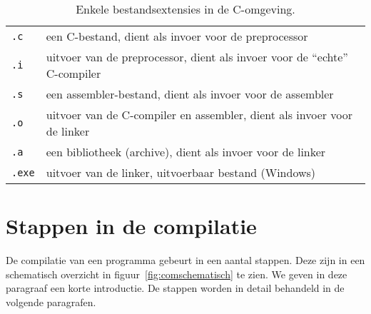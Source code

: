 \begin{table}[!ht]
\centering
\caption{Enkele bestandsextensies in de C-omgeving.}
\label{tab:comsuffix}
\begin{tabular}{ll}
\toprule
\texttt{.c}   & een C-bestand, dient als invoer voor de preprocessor \\
\texttt{.i}   & uitvoer van de preprocessor, dient als invoer voor de ``echte'' C-compiler \\
\texttt{.s}   & een assembler-bestand, dient als invoer voor de assembler \\
\texttt{.o}   & uitvoer van de C-compiler en assembler, dient als invoer voor de linker \\
\texttt{.a}   & een bibliotheek (archive), dient als invoer voor de linker \\
\texttt{.exe} & uitvoer van de linker, uitvoerbaar bestand (Windows)
\end{tabular}
\end{table}


\section{Stappen in de compilatie}
De compilatie van een programma gebeurt in een aantal stappen. Deze zijn in een schematisch overzicht in figuur~\ref{fig:comschematisch} te zien. We geven in deze paragraaf een korte introductie. De stappen worden in detail behandeld in de volgende paragrafen.

